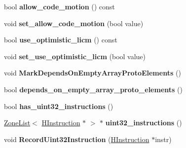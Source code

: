 \begin{DoxyCompactItemize}
\item 
bool {\bfseries allow\+\_\+code\+\_\+motion} () const \hypertarget{classv8_1_1internal_1_1_h_graph_ac078cb9e7db5bc61b3c4c5f80c677599}{}\label{classv8_1_1internal_1_1_h_graph_ac078cb9e7db5bc61b3c4c5f80c677599}

\item 
void {\bfseries set\+\_\+allow\+\_\+code\+\_\+motion} (bool value)\hypertarget{classv8_1_1internal_1_1_h_graph_a2b2c6549590785aa88db794dda3f7fd5}{}\label{classv8_1_1internal_1_1_h_graph_a2b2c6549590785aa88db794dda3f7fd5}

\item 
bool {\bfseries use\+\_\+optimistic\+\_\+licm} () const \hypertarget{classv8_1_1internal_1_1_h_graph_a93424377722c1c14e19428320600af3a}{}\label{classv8_1_1internal_1_1_h_graph_a93424377722c1c14e19428320600af3a}

\item 
void {\bfseries set\+\_\+use\+\_\+optimistic\+\_\+licm} (bool value)\hypertarget{classv8_1_1internal_1_1_h_graph_af2933f1c59d5989806ab072bcc976b59}{}\label{classv8_1_1internal_1_1_h_graph_af2933f1c59d5989806ab072bcc976b59}

\item 
void {\bfseries Mark\+Depends\+On\+Empty\+Array\+Proto\+Elements} ()\hypertarget{classv8_1_1internal_1_1_h_graph_a6ed67ba894d386f49e5880693c3542f4}{}\label{classv8_1_1internal_1_1_h_graph_a6ed67ba894d386f49e5880693c3542f4}

\item 
bool {\bfseries depends\+\_\+on\+\_\+empty\+\_\+array\+\_\+proto\+\_\+elements} ()\hypertarget{classv8_1_1internal_1_1_h_graph_af748e3b4fa5874f60550717ebe9969dd}{}\label{classv8_1_1internal_1_1_h_graph_af748e3b4fa5874f60550717ebe9969dd}

\item 
bool {\bfseries has\+\_\+uint32\+\_\+instructions} ()\hypertarget{classv8_1_1internal_1_1_h_graph_a4d20cefedbe60b2abd5a04c4feb035c3}{}\label{classv8_1_1internal_1_1_h_graph_a4d20cefedbe60b2abd5a04c4feb035c3}

\item 
\hyperlink{classv8_1_1internal_1_1_zone_list}{Zone\+List}$<$ \hyperlink{classv8_1_1internal_1_1_h_instruction}{H\+Instruction} $\ast$ $>$ $\ast$ {\bfseries uint32\+\_\+instructions} ()\hypertarget{classv8_1_1internal_1_1_h_graph_a825d76e5af2049325f58f71a79eeb301}{}\label{classv8_1_1internal_1_1_h_graph_a825d76e5af2049325f58f71a79eeb301}

\item 
void {\bfseries Record\+Uint32\+Instruction} (\hyperlink{classv8_1_1internal_1_1_h_instruction}{H\+Instruction} $\ast$instr)\hypertarget{classv8_1_1internal_1_1_h_graph_a6a4cfb87806331c53451a03f7a880bef}{}\label{classv8_1_1internal_1_1_h_graph_a6a4cfb87806331c53451a03f7a880bef}


\end{DoxyCompactItemize}
